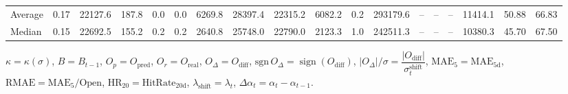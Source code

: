 \begin{threeparttable}
{\begin{tabular}{lrrrrrrrrrrrrrrrrr}
Average &     0.17 & 22127.6 &             187.8 &               0.0 &                0.0 &             6269.8 & 28397.4 & 22315.2 &     6082.2 &                      0.2 &            293179.6 &         -- &        -- &             -- &          11414.1 &           50.88 &                  66.83 \\
 Median &     0.15 & 22692.5 &             155.2 &               0.2 &                0.2 &             2640.8 & 25748.0 & 22790.0 &     2123.3 &                      1.0 &            242511.3 &         -- &        -- &             -- &          10380.3 &           45.70 &                  67.50 \\
\bottomrule
\end{tabular}
}
\begin{tablenotes}\footnotesize
\item $\kappa=\kappa(\sigma)$, $B=B_{t-1}$, $O_p=O_{\text{pred}}$, $O_r=O_{\text{real}}$, $O_\Delta=O_{\text{diff}}$, $\mathrm{sgn}\,O_\Delta=\operatorname{sign}(O_{\text{diff}})$, $|O_\Delta|/\sigma=\dfrac{|O_{\text{diff}}|}{\sigma_t^{\text{shift}}}$, $\mathrm{MAE}_5=\mathrm{MAE}_{5\text{d}}$, $\mathrm{RMAE}= \mathrm{MAE}_5 / \text{Open}$, $\mathrm{HR}_{20}=\mathrm{HitRate}_{20\text{d}}$, 
$\lambda_{\text{shift}}=\lambda_t$, 
$\Delta\alpha_t=\alpha_t-\alpha_{t-1}$.
\end{tablenotes}
\end{threeparttable}
\endgroup


